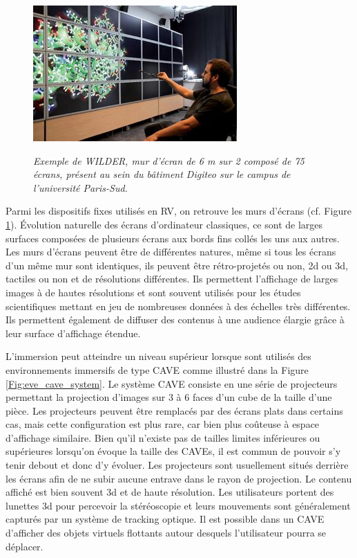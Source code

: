 \begin{figure}
  \centering
  {\includegraphics[width=.65\linewidth]{./figures/ch2/screen_wall}}
    \caption{{\it Exemple de WILDER, mur d'écran de 6 m sur 2 composé de 75 écrans, présent au sein du bâtiment Digiteo sur le campus de l'université Paris-Sud.}}
  \label{Fig:screen_wall}
  \hspace{0.3cm}
\end{figure}

Parmi les dispositifs fixes utilisés en RV, on retrouve les murs d'écrans (cf. Figure \ref{Fig:screen_wall}). Évolution naturelle des écrans d'ordinateur classiques, ce sont de larges surfaces composées de plusieurs écrans aux bords fins collés les uns aux autres. Les murs d'écrans peuvent être de différentes natures, même si tous les écrans d'un même mur sont identiques, ils peuvent être rétro-projetés ou non, 2d ou 3d, tactiles ou non et de résolutions différentes. Ils permettent l'affichage de larges images à de hautes résolutions et sont souvent utilisés pour les études scientifiques mettant en jeu de nombreuses données à des échelles très différentes. Ils permettent également de diffuser des contenus à une audience élargie grâce à leur surface d'affichage étendue.

L'immersion peut atteindre un niveau supérieur lorsque sont utilisés des environnements immersifs de type CAVE \cite{cruz-neira_cave:_1992} comme illustré dans la Figure \ref{Fig:eve_cave_system}. Le système CAVE consiste en une série de projecteurs permettant la projection d'images sur 3 à 6 faces d'un cube de la taille d'une pièce. Les projecteurs peuvent être remplacés par des écrans plats dans certains cas, mais cette configuration est plus rare, car bien plus coûteuse à espace d'affichage similaire. Bien qu'il n'existe pas de tailles limites inférieures ou supérieures lorsqu'on évoque la taille des CAVEs, il est commun de pouvoir s'y tenir debout et donc d'y évoluer. Les projecteurs sont usuellement situés derrière les écrans afin de ne subir aucune entrave dans le rayon de projection. Le contenu affiché est bien souvent 3d et de haute résolution. Les utilisateurs portent des lunettes 3d pour percevoir la stéréoscopie et leurs mouvements sont généralement capturés par un système de tracking optique. Il est possible dans un CAVE d'afficher des objets virtuels flottants autour desquels l'utilisateur pourra se déplacer.

